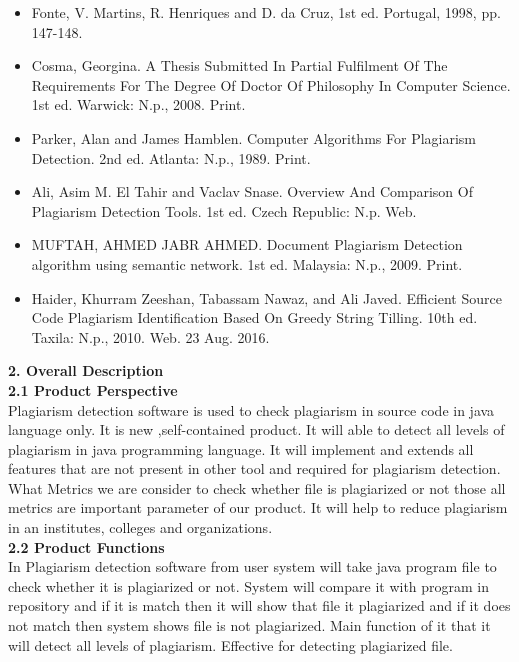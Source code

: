 	 
	 \begin{itemize}
	 
	\item Fonte, V. Martins, R. Henriques and D. da Cruz, 1st ed. Portugal, 1998, pp. 147-148.\\
	
	
	\item Cosma, Georgina. A Thesis Submitted In Partial Fulfilment Of The Requirements For The Degree Of Doctor Of Philosophy In Computer Science. 1st ed. Warwick: N.p., 2008. Print.\\
	
	\item Parker, Alan and James Hamblen. Computer Algorithms For Plagiarism Detection. 2nd ed. Atlanta: N.p., 1989. Print.\\
	\item Ali, Asim M. El Tahir and Vaclav Snase. Overview And Comparison Of Plagiarism Detection Tools. 1st ed. Czech Republic: N.p. Web.\\
	\item MUFTAH, AHMED JABR AHMED. Document Plagiarism Detection algorithm using semantic network. 1st ed. Malaysia: N.p., 2009. Print.\\
	\item Haider, Khurram Zeeshan, Tabassam Nawaz, and Ali Javed. Efficient Source Code Plagiarism Identification Based On Greedy String Tilling. 10th ed. Taxila: N.p., 2010. Web. 23 Aug. 2016.\\
	
	\end{itemize}
	\textbf{2.	Overall Description}\\
	\textbf{2.1	Product Perspective}\\
	Plagiarism detection software is used to check plagiarism in source code in java language only. It is new ,self-contained product. It will able to detect all levels of plagiarism in java programming language. It will implement and extends all features that are not present in other tool and required for plagiarism detection. What Metrics we are  consider to check whether file is plagiarized or not those all metrics are important parameter of our product.  It will help to reduce plagiarism in an institutes, colleges and organizations.\\
	\textbf{2.2	Product Functions}\\
	In Plagiarism detection software from user system will take java program file to check whether it is plagiarized or not. System will compare it with program in repository and if it is match then it will show that file it plagiarized and if it does not match then system shows file is not plagiarized. Main function of it that it will detect all levels of plagiarism. Effective for detecting plagiarized file. \\
